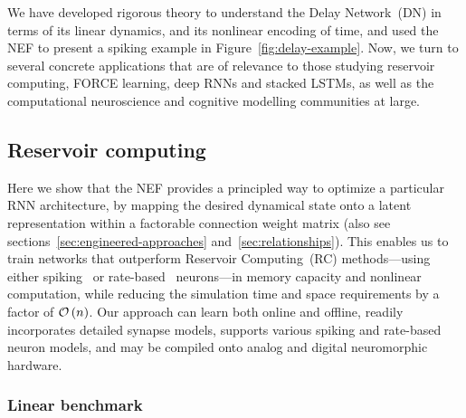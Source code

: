We have developed rigorous theory to understand the Delay Network~(DN) in terms of its linear dynamics, and its nonlinear encoding of time, and used the NEF to present a spiking example in Figure~\ref{fig:delay-example}.
Now, we turn to several concrete applications that are of relevance to those studying reservoir computing, FORCE learning, deep RNNs and stacked LSTMs, as well as the computational neuroscience and cognitive modelling communities at large.

\subsection{Reservoir computing}
\label{sec:delay-rc}

Here we show that the NEF provides a principled way to optimize a particular RNN architecture, by mapping the desired dynamical state onto a latent representation within a factorable connection weight matrix (also see sections~\ref{sec:engineered-approaches} and~\ref{sec:relationships}).
This enables us to train networks that outperform Reservoir Computing~(RC) methods---using either spiking~\citep[LSM;][]{maass2002real} or rate-based~\citep[ESN;][]{jaeger2001echo} neurons---in memory capacity and nonlinear computation, while reducing the simulation time and space requirements by a factor of $\mathcal{O}\left({n}\right)$.
Our approach can learn both online and offline, readily incorporates detailed synapse models, supports various spiking and rate-based neuron models, and may be compiled onto analog and digital neuromorphic hardware.

\subsubsection{Linear benchmark}

